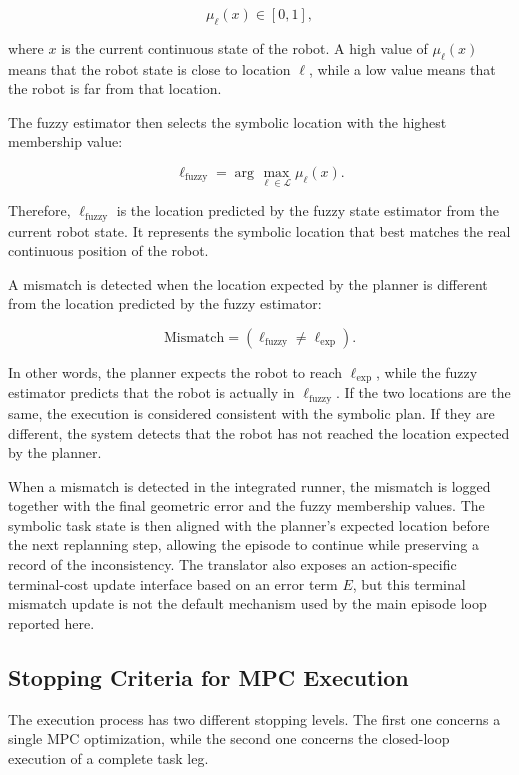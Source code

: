 \documentclass{article}
\begin{document}
\[
\mu_{\ell}(x) \in [0,1],
\]

where \(x\) is the current continuous state of the robot. A high value of \(\mu_{\ell}(x)\) means that the robot state is close to location \(\ell\), while a low value means that the robot is far from that location.

The fuzzy estimator then selects the symbolic location with the highest membership value:

\[
\ell_{\mathrm{fuzzy}}
=
\arg\max_{\ell \in \mathcal{L}} \mu_{\ell}(x).
\]

Therefore, \(\ell_{\mathrm{fuzzy}}\) is the location predicted by the fuzzy state estimator from the current robot state. It represents the symbolic location that best matches the real continuous position of the robot.

A mismatch is detected when the location expected by the planner is different from the location predicted by the fuzzy estimator:

\[
\mathrm{Mismatch}
=
\left(
\ell_{\mathrm{fuzzy}} \neq \ell_{\mathrm{exp}}
\right).
\]

In other words, the planner expects the robot to reach \(\ell_{\mathrm{exp}}\), while the fuzzy estimator predicts that the robot is actually in \(\ell_{\mathrm{fuzzy}}\). If the two locations are the same, the execution is considered consistent with the symbolic plan. If they are different, the system detects that the robot has not reached the location expected by the planner.

When a mismatch is detected in the integrated runner, the mismatch is logged together with the final geometric error and the fuzzy membership values. The symbolic task state is then aligned with the planner's expected location before the next replanning step, allowing the episode to continue while preserving a record of the inconsistency. The translator also exposes an action-specific terminal-cost update interface based on an error term \(E\), but this terminal mismatch update is not the default mechanism used by the main episode loop reported here.



\subsection{Stopping Criteria for MPC Execution}

The execution process has two different stopping levels. The first one concerns a single MPC optimization, while the second one concerns the closed-loop execution of a complete task leg.
\end{document}
